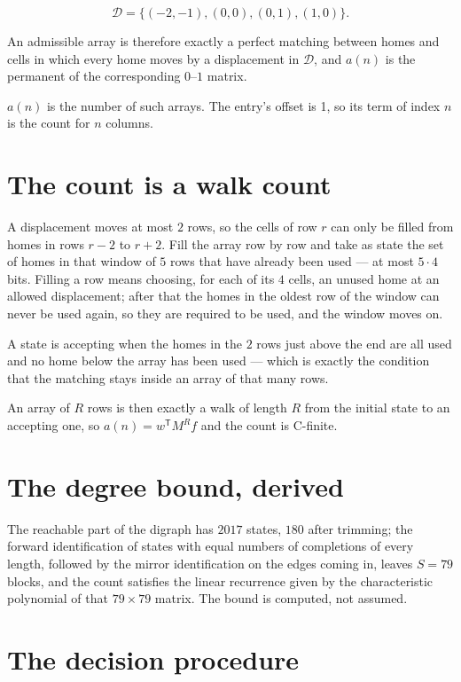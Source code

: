 \documentclass[11pt]{article}
\theoremstyle{definition}
\begin{document}
\[\mathcal{D} = \{(-2,-1), (0,0), (0,1), (1,0)\}.\]

An admissible array is therefore exactly a perfect matching between homes and cells in which every home moves by a displacement in $\mathcal{D}$, and $a(n)$ is the permanent of the corresponding $0$--$1$ matrix.

$a(n)$ is the number of such arrays. The entry's offset is 1, so its term of index $n$ is the count for $n$ columns.

\section{The count is a walk count}

A displacement moves at most $2$ rows, so the cells of row $r$ can only be filled from homes in rows $r-2$ to $r+2$. Fill the array row by row and take as state the set of homes in that window of $5$ rows that have already been used --- at most $5\cdot4$ bits. Filling a row means choosing, for each of its $4$ cells, an unused home at an allowed displacement; after that the homes in the oldest row of the window can never be used again, so they are required to be used, and the window moves on.

A state is accepting when the homes in the $2$ rows just above the end are all used and no home below the array has been used --- which is exactly the condition that the matching stays inside an array of that many rows.

An array of $R$ rows is then exactly a walk of length $R$ from the initial state to an accepting one, so $a(n) = w^{\mathsf T}M^{R}f$ and the count is C-finite.

\section{The degree bound, derived}

The reachable part of the digraph has $2017$ states, $180$ after trimming; the forward identification of states with equal numbers of completions of every length, followed by the mirror identification on the edges coming in, leaves $S = 79$ blocks, and the count satisfies the linear recurrence given by the characteristic polynomial of that $79\times79$ matrix. The bound is computed, not assumed.

\section{The decision procedure}
\end{document}
